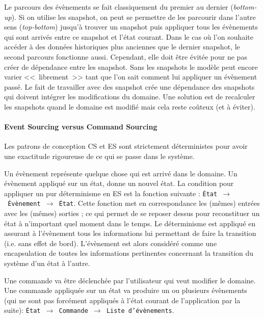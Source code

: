 Le parcours des évènements se fait classiquement du premier au dernier 
(\textit{bottom-up}). Si on utilise les \gls{snapshot}, on peut se permettre de les 
parcourir dans l'autre sens (\textit{top-bottom}) jusqu'à trouver un \gls{snapshot} 
puis appliquer tous les évènements qui sont arrivés entre ce \gls{snapshot} et 
l'état courant. Dans le cas où l'on souhaite accéder à des données historiques 
plus anciennes que le dernier \gls{snapshot}, le second parcours fonctionne 
aussi. Cependant, elle doit être évitée pour ne pas créer de dépendance entre 
les \gls{snapshot}. Sans les snapshots le modèle peut encore varier 
<<~librement~>> tant que l'on sait comment lui appliquer un évènement passé. 
Le fait de travailler avec des \gls{snapshot} crée une dépendance des 
snapshots qui doivent intégrer les modifications du domaine. Une solution est 
de recalculer les snapshots quand le domaine est modifié mais cela reste 
coûteux (et à éviter).

\paragraph{Event Sourcing versus Command Sourcing}
Les patrons de conception \gls{CS} et \gls{ES} sont strictement déterministes pour 
avoir une exactitude rigoureuse de ce qui se passe dans le système.

Un évènement représente quelque chose qui est arrivé dans le domaine. Un 
évènement appliqué sur un état, donne un nouvel état. 
La condition pour appliquer un pur déterminisme en \gls{ES} est la fonction 
suivante : \texttt{État~$\rightarrow$~Évènement~$\rightarrow$~État}. 
Cette fonction met en correspondance les (mêmes) entrées avec les (mêmes) 
sorties ; ce qui permet de se reposer dessus pour reconstituer un état à 
n'important quel moment dans le temps. 
Le déterminisme est appliqué en assurant à l'évènement tous les 
informations lui permettant de faire la transition (i.e. sans effet de bord). 
L'évènement est alors considéré comme une encapsulation de toutes les 
informations pertinentes concernant la transition du système d'un état à l'autre.

Une commande va être déclenchée par l'utilisateur qui veut modifier le domaine. 
Une commande appliquée sur un état va produire un ou plusieurs évènements (qui 
ne sont pas forcément appliqués à l'état courant de l'application par la suite): 
\texttt{État~$\rightarrow$~Commande~$\rightarrow$~Liste d'évènements}.

